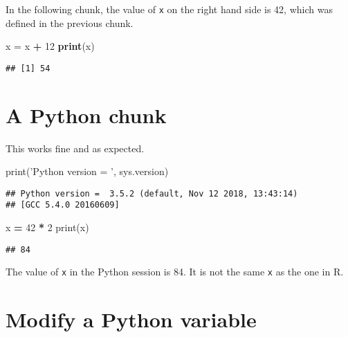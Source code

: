 \documentclass[]{book}
\newenvironment{Shaded}{\begin{snugshade}}{\end{snugshade}}
\newcommand{\BuiltInTok}[1]{#1}
\newcommand{\DecValTok}[1]{\textcolor[rgb]{0.00,0.00,0.81}{#1}}
\newcommand{\KeywordTok}[1]{\textcolor[rgb]{0.13,0.29,0.53}{\textbf{#1}}}
\newcommand{\NormalTok}[1]{#1}
\newcommand{\OperatorTok}[1]{\textcolor[rgb]{0.81,0.36,0.00}{\textbf{#1}}}
\newcommand{\StringTok}[1]{\textcolor[rgb]{0.31,0.60,0.02}{#1}}
\begin{document}
In the following chunk, the value of \texttt{x} on the right hand side
is 42, which was defined in the previous chunk.

\begin{Shaded}
\begin{Highlighting}[]
\NormalTok{x =}\StringTok{ }\NormalTok{x }\OperatorTok{+}\StringTok{ }\DecValTok{12}
\KeywordTok{print}\NormalTok{(x)}
\end{Highlighting}
\end{Shaded}

\begin{verbatim}
## [1] 54
\end{verbatim}

\hypertarget{a-python-chunk}{%
\section{A Python chunk}\label{a-python-chunk}}

This works fine and as expected.

\begin{Shaded}
\begin{Highlighting}[]
\BuiltInTok{print}\NormalTok{(}\StringTok{'Python version = '}\NormalTok{, sys.version)}
\end{Highlighting}
\end{Shaded}

\begin{verbatim}
## Python version =  3.5.2 (default, Nov 12 2018, 13:43:14) 
## [GCC 5.4.0 20160609]
\end{verbatim}

\begin{Shaded}
\begin{Highlighting}[]
\NormalTok{x }\OperatorTok{=} \DecValTok{42} \OperatorTok{*} \DecValTok{2}
\BuiltInTok{print}\NormalTok{(x) }
\end{Highlighting}
\end{Shaded}

\begin{verbatim}
## 84
\end{verbatim}

The value of \texttt{x} in the Python session is 84.
It is not the same \texttt{x} as the one in R.

\hypertarget{modify-a-python-variable}{%
\section{Modify a Python variable}\label{modify-a-python-variable}}
\end{document}
